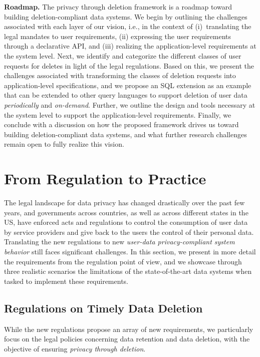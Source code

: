 \documentclass[11pt,dvipdfmx]{article}
\newcommand\Paragraph[1]{\vspace{0.02in}  \noindent \textbf{#1.}}
\begin{document}
\newpage
\Paragraph{Roadmap} 
The privacy through deletion framework is a roadmap toward building deletion-compliant data systems. 
We begin by outlining the challenges associated with each layer of our vision, i.e., in the context of (i)~translating the legal mandates to user requirements, (ii) expressing the user requirements through a declarative API, and (iii) realizing the application-level requirements at the system level.
Next, we identify and categorize the different classes of user requests for deletes in light of the legal regulations. 
Based on this, we present the challenges associated with transforming the classes of deletion requests into application-level specifications, and we propose an SQL extension as an example that can be extended to other query languages to support deletion of user data \textit{periodically} and \textit{on-demand}. 
Further, we outline the design and tools necessary at the system level to support the application-level requirements. 
Finally, we conclude with a discussion on how the proposed framework drives us toward building deletion-compliant data systems, and what further research challenges remain open to fully realize this vision.






%
 
\section{From Regulation to Practice}
\label{sec:legal}


The legal landscape for data privacy has changed drastically over the past few years, and governments across countries, as well as across different states in the US, have enforced acts and regulations to control the consumption of user data by service providers and give back to the users the control of their personal data. 
Translating the new regulations to new \emph{user-data privacy-compliant system behavior}
still faces significant challenges. In this section, we present in more detail the 
requirements from the regulation point of view, and we showcase through three realistic
scenarios the limitations of the state-of-the-art data systems when tasked to implement
these requirements. 


\subsection{Regulations on Timely Data Deletion}
While the new regulations propose an array of new requirements, we particularly focus on the legal 
policies concerning data retention and data deletion, with the objective of ensuring 
\textit{privacy through deletion}. 
\end{document}
